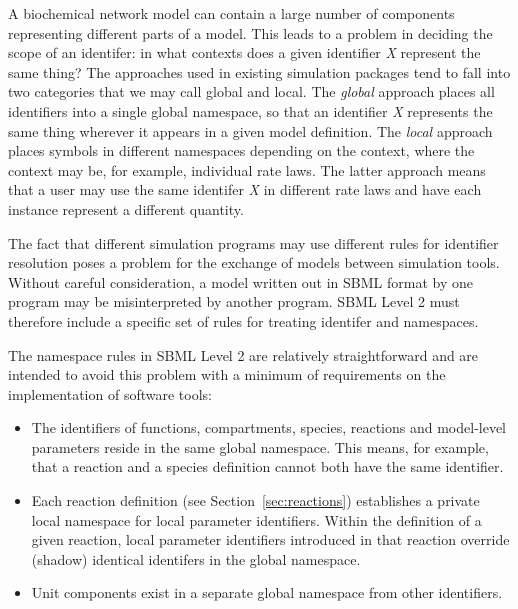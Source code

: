 \documentclass[10pt,twocolumntoc]{cekarticle}
\begin{document}
A biochemical network model can contain a large number of
components representing different parts of a model.  This leads to
a problem in deciding the scope of an identifer: in what contexts
does a given identifier \emph{X} represent the same thing?  The
approaches used in existing simulation packages tend to fall into
two categories that we may call global and local.  The
\emph{global} approach places all identifiers into a single global
namespace, so that an identifier \emph{X} represents the same thing
wherever it appears in a given model definition.  The \emph{local}
approach places symbols in different namespaces depending on the
context, where the context may be, for example, individual rate
laws.  The latter approach means that a user may use the same
identifer \emph{X} in different rate laws and have each instance
represent a different quantity.

The fact that different simulation programs may use different
rules for identifier resolution poses a problem for the exchange
of models between simulation tools.  Without careful
consideration, a model written out in SBML format by one program
may be misinterpreted by another program.  SBML Level 2 must
therefore include a specific set of rules for treating identifer
and namespaces.

The namespace rules in SBML Level 2 are relatively straightforward
and are intended to avoid this problem with a minimum of
requirements on the implementation of software tools:
\begin{itemize}
  
\item The identifiers of functions, compartments, species, reactions and
  model-level parameters reside in the same global namespace. This means,
  for example, that a reaction and a species definition cannot both have
  the same identifier.

\item Each reaction definition (see Section~\ref{sec:reactions})
  establishes a private local namespace for local parameter identifiers. Within the
  definition of a given reaction, local parameter identifiers introduced in that
  reaction override (shadow) identical identifers in the global namespace.

\item Unit components exist in a separate global namespace from
other identifiers.

\end{itemize}
\end{document}
